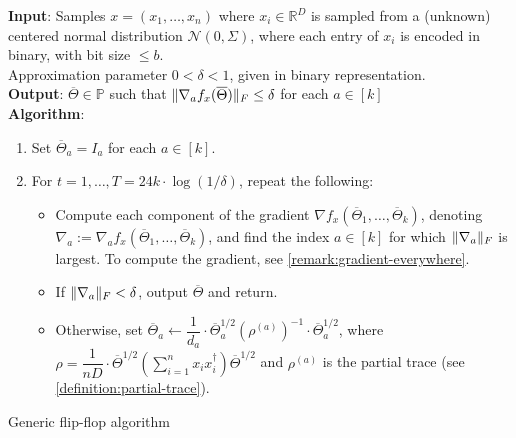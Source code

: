 \documentclass[aos]{imsart}
\theoremstyle{definition}
\numberwithin{equation}{section}
\DeclarePairedDelimiter{\norm}{\lVert}{\rVert}
\newcommand{\R}{{\mathbb{R}}}
\newcommand{\otheta}{\overline{\Theta}}
\newcommand{\eps}{\varepsilon}
\newcommand{\cN}{\mathcal{N}}
\newcommand{\SPD}{\mathbb{P}}
\newcommand{\samp}{x}
\def\dmax{d_{\max}}
\begin{document}
\begin{Algorithm}
\textbf{Input}: Samples $\samp = (\samp_1, \ldots, \samp_n)$ where $\samp_i \in \R^D$ is sampled from a (unknown) centered normal distribution $\cN(0, \Sigma)$, where each entry of $\samp_i$ is encoded in binary, with bit size $\le b$. \\ Approximation parameter $0 < \delta < 1$, given in binary representation. \\[.3ex]

\textbf{Output}: $\otheta \in \SPD$ such that $\norm{\nabla_a f_x(\otheta)}_F \leq \delta$ for each $a \in [k]$ \\[.3ex]

\textbf{Algorithm}:
\begin{enumerate}
\item\label{it:flip-flop step 1} Set $\otheta_a = I_a$ for each $a \in [k]$. 

\vspace{5pt}

\item\label{it:flip-flop step 2} For $t=1,\dots,T = 24 k \cdot \log(1/\delta)$, repeat the following:

\vspace{5pt}

\begin{itemize}
\item Compute each component of the gradient $\nabla f_{\samp}(\otheta_1, \ldots, \otheta_k)$, denoting $\nabla_a := \nabla_a f_{\samp}(\otheta_1, \ldots, \otheta_k)$, and find the index $a \in [k]$ for which $\norm{\nabla_a}_F$ is largest. To compute the gradient, see \cref{remark:gradient-everywhere}.

\vspace{5pt}

\item
If $\norm{\nabla_a}_F < \delta$, output $\otheta$ and return.

\vspace{5pt}

\item Otherwise, set $\otheta_a \leftarrow  \dfrac{1}{d_a} \cdot \otheta_a^{1/2} (\rho^{(a)})^{-1} \cdot \otheta_a^{1/2}$, where $\rho = \dfrac{1}{nD} \cdot  \otheta^{1/2} \left( \sum_{i=1}^n x_ix_i^\dagger \right) \otheta^{1/2}$ and $\rho^{(a)}$ is the partial trace (see \cref{definition:partial-trace}).
\end{itemize}
\end{enumerate}
\caption{Generic flip-flop algorithm}\label{alg:flip-flop}
\end{Algorithm}
\end{document}
